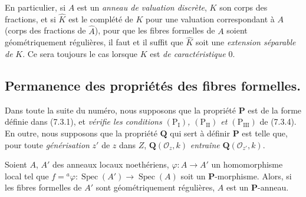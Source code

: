 \begin{remarks}[7.3.19]
\begin{enumerate}
En particulier, si $A$ est un \emph{anneau de valuation discrète}, $K$
son corps des fractions, et si $\widehat K$ est le complété de $K$ pour
une valuation correspondant à $A$ (corps des fractions de $\widehat A$),
pour que les fibres formelles de $A$ soient géométriquement régulières,
il faut et il suffit que $\widehat K$ soit une \emph{extension séparable
de} $K$. Ce sera toujours le cas lorsque $K$ est \emph{de caractéristique}
0.
\end{enumerate}
\end{remarks}

\subsection{Permanence des propriétés des fibres formelles.}
\label{subsection:IV.7.4-fr}

\begin{env}[7.4.1]
\label{IV.2.s7.4.1-fr}
Dans toute la suite du numéro, nous supposons que la propriété
$\boldsymbol P$ est de la forme définie dans (7.3.1), et \emph{vérifie
les conditions $(\mathrm P_{\mathrm I})$, $(\mathrm P_{\mathrm{II}})$ et
$(\mathrm P_{\mathrm{III}})$} de (7.3.4). En outre, nous supposons que la
propriété $\boldsymbol Q$ qui sert à définir $\boldsymbol P$ est telle
que, pour toute \emph{générisation} $z'$ de $z$ dans $Z$,
$\boldsymbol Q(\mathscr O_z,k)$ \emph{entraîne}
$\boldsymbol Q(\mathscr O_{z'},k)$.
\end{env}

\begin{lemma}[7.4.2]
\label{IV.2.s7.4.2-fr}
Soient $A$, $A'$ des anneaux locaux noethériens,
$\varphi:A\to A'$ un homomorphisme local tel que
$f={}^a\varphi:\operatorname{Spec}(A')\to\operatorname{Spec}(A)$ soit un
$\boldsymbol P$-morphisme. Alors, si les fibres formelles de $A'$ sont
géométriquement régulières, $A$ est un $\boldsymbol P$-anneau.
\end{lemma}


